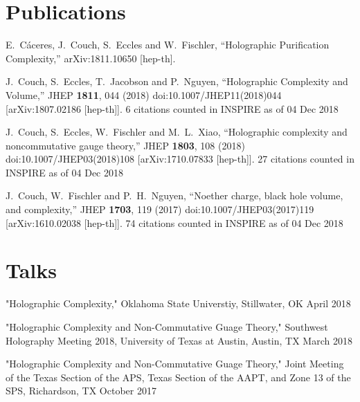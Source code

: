 \documentclass[letterpaper]{article}
\renewenvironment{itemize}{
  \begin{list}{}{
    \setlength{\leftmargin}{1.5em}
  }
}{
  \end{list}
}
\begin{document}
\section*{Publications}
\begin{itemize}

\item 
  E.~C\'aceres, J.~Couch, S.~Eccles and W.~Fischler,
  ``Holographic Purification Complexity,''
  arXiv:1811.10650 [hep-th].

\item 
  J.~Couch, S.~Eccles, T.~Jacobson and P.~Nguyen,
  ``Holographic Complexity and Volume,''
  JHEP {\bf 1811}, 044 (2018)
  doi:10.1007/JHEP11(2018)044
  [arXiv:1807.02186 [hep-th]].
  6 citations counted in INSPIRE as of 04 Dec 2018
  
\item
  J.~Couch, S.~Eccles, W.~Fischler and M.~L.~Xiao,
  ``Holographic complexity and noncommutative gauge theory,''
  JHEP {\bf 1803}, 108 (2018)
  doi:10.1007/JHEP03(2018)108
  [arXiv:1710.07833 [hep-th]].
  27 citations counted in INSPIRE as of 04 Dec 2018

\item  
  J.~Couch, W.~Fischler and P.~H.~Nguyen,
  ``Noether charge, black hole volume, and complexity,''
  JHEP {\bf 1703}, 119 (2017)
  doi:10.1007/JHEP03(2017)119
  [arXiv:1610.02038 [hep-th]].
  74 citations counted in INSPIRE as of 04 Dec 2018

  
\end{itemize}

\section*{Talks}
\begin{itemize}

\item "Holographic Complexity," Oklahoma State Universtiy, Stillwater, OK \hfill April 2018

\item "Holographic Complexity and Non-Commutative Guage Theory," Southwest Holography Meeting 2018, University of Texas at Austin, Austin, TX \hfill March 2018

\item "Holographic Complexity and Non-Commutative Guage Theory," Joint Meeting of the Texas Section of the APS, Texas Section of the AAPT, and Zone 13 of the SPS, Richardson, TX \hfill October 2017

\end{itemize}
\end{document}
